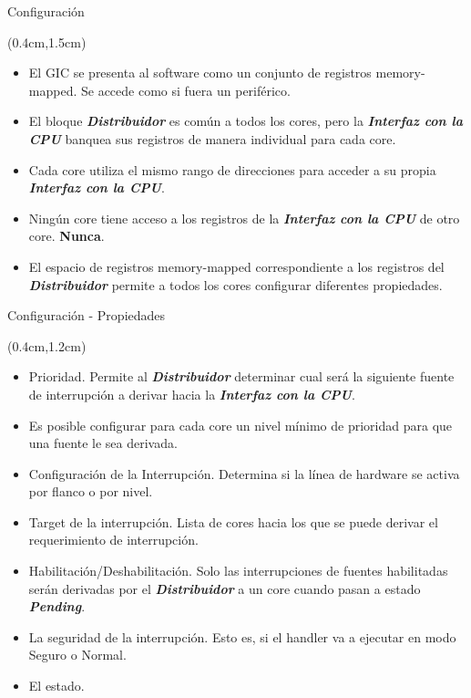 \documentclass[usenames,table,xcolor={x11names},aspectratio=169]{beamer}
\begin{document}
\begin{frame}[t]{Configuración}
 \begin{textblock*}{\textwidth}(0.4cm,1.5cm)
  \begin{itemize}[<+(1)->]\justifying \parskip 0.2cm
   \item El GIC se presenta al software como un conjunto de registros memory-mapped. Se accede como si fuera un periférico.
   \item El bloque \textbf{\textit{Distribuidor}} es común a todos los cores, pero la \textit{\textbf{Interfaz con la CPU}} banquea sus registros de manera individual para cada core. 
   \item Cada core utiliza el mismo rango de direcciones para acceder a su propia \textbf{\textit{Interfaz con la CPU}}.
   \item Ningún core tiene acceso a los registros de la \textbf{\textit{Interfaz con la CPU}} de otro core. \textbf{Nunca}.
   \item El espacio de registros memory-mapped correspondiente a los registros del \textbf{\textit{Distribuidor}} permite a  todos los cores configurar diferentes propiedades.
  \end{itemize}
 \end{textblock*}
\end{frame}

\begin{frame}[t]{Configuración - Propiedades}
 \begin{textblock*}{\textwidth}(0.4cm,1.2cm)
  \begin{itemize}[<+(1)->]\justifying%
   \item Prioridad. Permite al \textbf{\textit{Distribuidor}} determinar cual será la siguiente fuente de interrupción a derivar hacia la \textbf{\textit{Interfaz con la CPU}}.
   \item Es posible configurar para cada core un nivel mínimo de prioridad para que una fuente le sea derivada.
   \item Configuración de la Interrupción. Determina si la línea de hardware se activa por flanco o por nivel.
   \item Target de la interrupción. Lista de cores hacia los que se puede derivar el requerimiento de interrupción.
   \item Habilitación/Deshabilitación. Solo las interrupciones de fuentes habilitadas serán derivadas por el \textbf{\textit{Distribuidor}} a un core cuando pasan a estado \textbf{\textit{\color{Blue2}Pending}}. 
   \item La seguridad de la interrupción. Esto es, si el handler va a ejecutar en modo Seguro o Normal.
   \item El estado.
  \end{itemize}
 \end{textblock*}
\end{frame}
\end{document}
